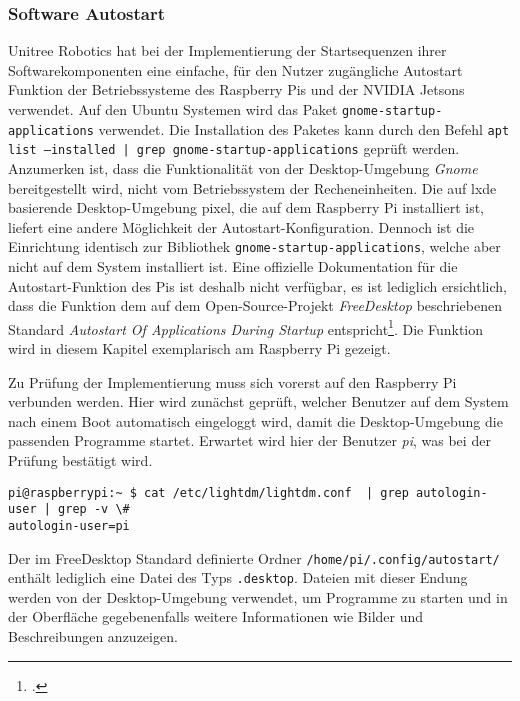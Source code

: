 \subsubsection{Software Autostart}
\label{subsubsec:software-autostart}

Unitree Robotics hat bei der Implementierung der Startsequenzen ihrer Softwarekomponenten eine einfache, für den Nutzer
zugängliche Autostart Funktion der Betriebssysteme des Raspberry Pis und der NVIDIA Jetsons verwendet.
Auf den Ubuntu Systemen wird das Paket \texttt{gnome\allowbreak -start\-up-\allowbreak app\-li\-cations} verwendet.
Die Installation des Paketes kann durch den Befehl \texttt{apt list --installed | grep gnome-\allowbreak start\-up-\allowbreak app\-li\-cations}
geprüft werden.
Anzumerken ist, dass die Funktionalität von der Desktop-Umgebung \emph{Gnome} bereitgestellt wird, nicht vom Betriebssystem
der Recheneinheiten.
Die auf \gls{lxde} basierende Desktop-Umgebung \gls{pixel}, die auf dem Raspberry Pi installiert ist, liefert eine andere
Möglichkeit der Autostart-Konfiguration.
Dennoch ist die Einrichtung identisch zur Bibliothek \texttt{gnome-\allowbreak start\-up-\allowbreak app\-li\-cations}, welche aber nicht auf dem System
installiert ist.
Eine offizielle Dokumentation für die Autostart-Funktion des Pis ist deshalb nicht verfügbar, es ist lediglich ersichtlich,
dass die Funktion dem auf dem Open-Source-Projekt \emph{FreeDesktop} beschriebenen Standard \emph{Autostart Of Applications During Startup}
entspricht\footcite{freedesktop_autostart}.
Die Funktion wird in diesem Kapitel exemplarisch am Raspberry Pi gezeigt.


Zu Prüfung der Implementierung muss sich vorerst auf den Raspberry Pi verbunden werden.
Hier wird zunächst geprüft, welcher Benutzer auf dem System nach einem Boot automatisch eingeloggt wird, damit die
Desktop-Umgebung die passenden Programme startet.
Erwartet wird hier der Benutzer \emph{pi}, was bei der Prüfung bestätigt wird.

\begin{lstlisting}
pi@raspberrypi:~ $ cat /etc/lightdm/lightdm.conf  | grep autologin-user | grep -v \#
autologin-user=pi
\end{lstlisting}

\noindent Der im FreeDesktop Standard definierte Ordner \texttt{/home/\allowbreak pi/\allowbreak .config/\allowbreak autostart/} enthält lediglich eine Datei des Typs
\texttt{.desktop}.
Dateien mit dieser Endung werden von der Desktop-Umgebung verwendet, um Programme zu starten und in der Oberfläche
gegebenenfalls weitere Informationen wie Bilder und Beschreibungen anzuzeigen.

